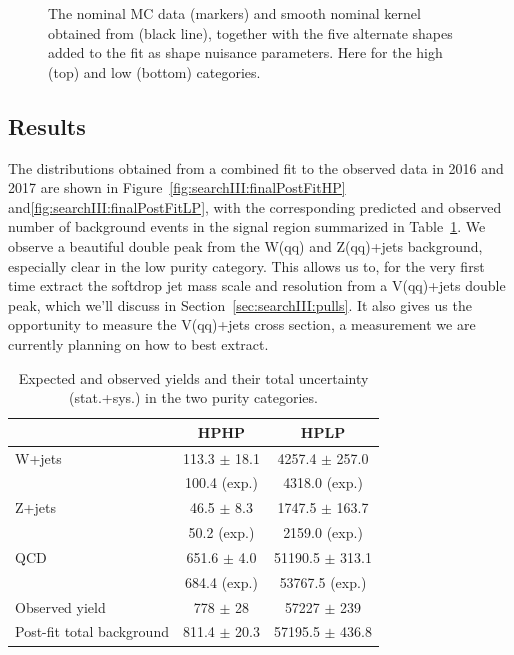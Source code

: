 \begin{figure}[h!]
\caption{The nominal MC data (markers) and smooth nominal kernel obtained from  (black line), together with the five alternate shapes added to the fit as shape nuisance parameters. Here for the high (top) and low (bottom) categories.}
\label{fig:searchIII:sys}
\end{figure}
\clearpage

\subsection{Results}
The distributions obtained from a combined fit to the observed data in 2016 and 2017 are shown in Figure~\ref{fig:searchIII:finalPostFitHP} and\ref{fig:searchIII:finalPostFitLP}, with the corresponding predicted and observed number of background events in the signal region summarized in Table~\ref{tab:searchIII:ObsEvents}. We observe a beautiful double peak from the W(qq) and Z(qq)+jets background, especially clear in the low purity category. This allows us to, for the very first time extract the softdrop jet mass scale and resolution from a V(qq)+jets double peak, which we'll discuss in Section~\ref{sec:searchIII:pulls}. It also gives us the opportunity to measure the V(qq)+jets cross section, a measurement we are currently planning on how to best extract.
\begin{table}[h!]
\centering
\begin{tabular}{lcc} 
 & HPHP & HPLP\\
 \hline
 \hline
W+jets & 113.3 $\pm$ 18.1 & 4257.4 $\pm$ 257.0 \\
            & 100.4 (exp.) & 4318.0 (exp.)\\
Z+jets & 46.5 $\pm$ 8.3 & 1747.5 $\pm$ 163.7\\
           & 50.2 (exp.) & 2159.0 (exp.) \\
QCD  & 651.6 $\pm$ 4.0 & 51190.5 $\pm$ 313.1 \\
          & 684.4 (exp.) & 53767.5 (exp.) \\
\hline
Observed yield & 778 $\pm$ 28 & 57227 $\pm$ 239\\
Post-fit total background & 811.4 $\pm$ 20.3 & 57195.5 $\pm$ 436.8\\
\hline
\hline
\end{tabular} 
\caption{Expected and observed yields and their total uncertainty (stat.+sys.) in the two purity categories.} 
\label{tab:searchIII:ObsEvents}
\end{table}

